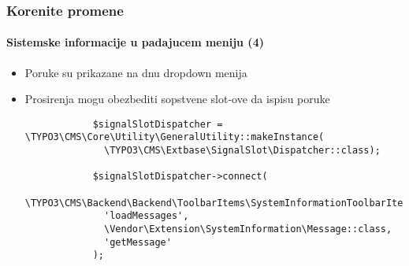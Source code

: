 \begin{frame}[fragile]
	\frametitle{Korenite promene}
	\framesubtitle{Sistemske informacije u padajucem meniju (4)}

	\lstset{basicstyle=\tiny\ttfamily}

	\begin{itemize}

		\item Poruke su prikazane na dnu dropdown menija

		\item Prosirenja mogu obezbediti sopstvene slot-ove da ispisu poruke

		\begin{lstlisting}
			$signalSlotDispatcher = \TYPO3\CMS\Core\Utility\GeneralUtility::makeInstance(
			  \TYPO3\CMS\Extbase\SignalSlot\Dispatcher::class);

			$signalSlotDispatcher->connect(
			  \TYPO3\CMS\Backend\Backend\ToolbarItems\SystemInformationToolbarItem::class,
			  'loadMessages',
			  \Vendor\Extension\SystemInformation\Message::class,
			  'getMessage'
			);
		\end{lstlisting}

	\end{itemize}

\end{frame}

